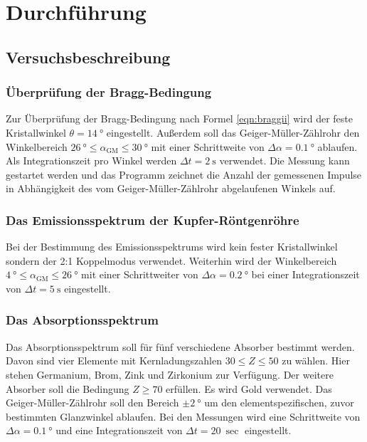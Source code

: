 \section{Durchführung}
\label{sec:Durchführung}



\FloatBarrier
\subsection{Versuchsbeschreibung}
\label{sec:Versuchsbeschreibung}

\subsubsection{Überprüfung der Bragg-Bedingung}
Zur Überprüfung der Bragg-Bedingung nach Formel \eqref{eqn:braggii} wird der feste Kristallwinkel
$\theta = \SI{14}{\degree}$ eingestellt. Außerdem soll das Geiger-Müller-Zählrohr den
Winkelbereich $\SI{26}{\degree} \le \alpha_{\mathrm{GM}} \le \SI{30}{\degree}$ mit einer
Schrittweite von $\Delta \alpha = \SI{0,1}{\degree}$ ablaufen. Als Integrationszeit pro
Winkel werden $\Delta t = \SI{2}{\second}$ verwendet.
Die Messung kann gestartet werden und das Programm zeichnet die Anzahl der gemessenen Impulse
in Abhängigkeit des vom Geiger-Müller-Zählrohr abgelaufenen Winkels auf.
\subsubsection{Das Emissionsspektrum der Kupfer-Röntgenröhre}
Bei der Bestimmung des Emissionsspektrums wird kein fester Kristallwinkel sondern der
2:1 Koppelmodus verwendet.
Weiterhin wird der Winkelbereich $\SI{4}{\degree} \le \alpha_{\mathrm{GM}} \le \SI{26}{\degree}$
mit einer Schrittweiter von $\Delta \alpha = \SI{0,2}{\degree}$ bei einer Integrationszeit
von $\Delta t = \SI{5}{\second}$ eingestellt.
\subsubsection{Das Absorptionsspektrum}
Das Absorptionsspektrum soll für fünf verschiedene Absorber bestimmt werden. Davon sind
vier Elemente mit Kernladungszahlen $30 \le Z \le 50$ zu wählen. Hier stehen Germanium,
Brom, Zink und Zirkonium zur Verfügung. Der weitere Absorber soll die Bedingung $Z \ge 70$
erfüllen. Es wird Gold verwendet.
Das Geiger-Müller-Zählrohr soll den Bereich $\pm \SI{2}{\degree}$ um den elementspezifischen,
zuvor bestimmten Glanzwinkel ablaufen.
Bei den Messungen wird eine Schrittweite von $\Delta \alpha = \SI{0,1}{\degree}$ und
eine Integrationszeit von $\Delta t = \SI{20}{\sec}$ eingestellt.

